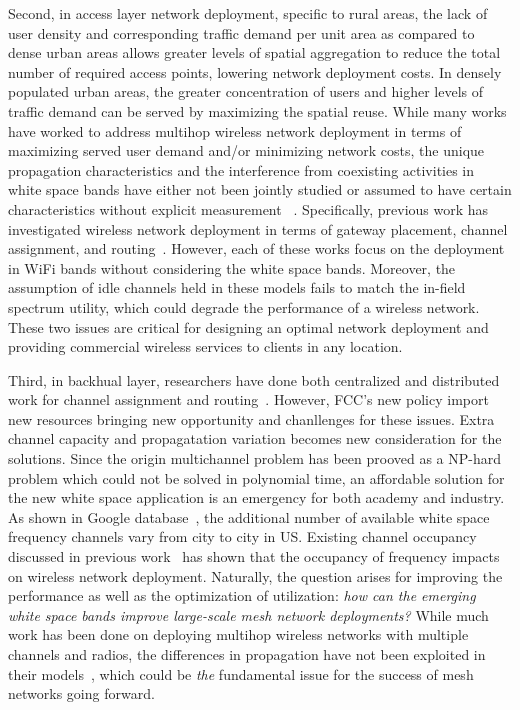 Second, in access layer network deployment, specific to rural areas, 
the lack of user density and corresponding traffic demand per unit area 
as compared to dense urban areas allows greater levels of spatial 
aggregation to reduce the total number of required access points, 
lowering network deployment costs. In densely populated urban areas, 
the greater concentration of users and higher levels of traffic demand 
can be served by maximizing the spatial reuse. While many works have 
worked to address multihop wireless network deployment in terms of 
maximizing served user demand and/or minimizing network costs, the 
unique propagation characteristics and the interference from coexisting
activities in white space bands have either not been jointly studied 
or assumed to have certain characteristics without explicit measurement
~\cite{si2010overview}. Specifically, previous work has investigated 
wireless network deployment in terms of gateway placement, channel 
assignment, and routing~\cite{he2008optimizing,marina2010topology}.
However, each of these works focus on the deployment in WiFi bands 
without considering the white space bands. Moreover, the assumption 
of idle channels held in these models fails to match the in-field 
spectrum utility, which could degrade the performance of a wireless 
network. These two issues are critical for designing an optimal 
network deployment and providing commercial wireless services to 
clients in any location.

Third, in backhual layer, researchers have done both centralized and 
distributed work for channel assignment and routing~\cite{raniwala2004centralized,wu2006distributed}.
However, FCC's new policy import new resources bringing new opportunity
and chanllenges for these issues.  Extra channel capacity and 
propagatation variation becomes new consideration for the solutions.
Since the origin multichannel problem has been prooved as a NP-hard
problem which could not be solved in polynomial time, an affordable 
solution for the new white space application is an emergency for 
both academy and industry. As shown in Google database~\cite{googledatabase}, 
the additional number of available white space frequency channels 
vary from city to city in US. Existing channel occupancy discussed in 
previous work~\cite{pcuiwinmee} has shown that the occupancy of 
frequency impacts on wireless network deployment. Naturally, the 
question arises for improving the performance as well as the optimization 
of utilization: {\it how can the emerging white space bands improve 
large-scale mesh network deployments?}  While much work has been done 
on deploying multihop wireless networks with multiple channels and 
radios, the differences in propagation have not been exploited in their 
models~\cite{tang2005interference, long2013fair,doraghinejad2014channel}, 
which could be {\it the} fundamental issue for the success of mesh 
networks going forward.

